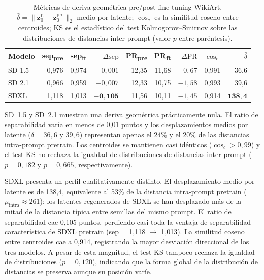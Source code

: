 \documentclass[12pt, a4paper, twoside]{book}
\newcommand{\z}{\mathbf{z}}
\begin{document}
\begin{table}[htb]
\centering
\caption{Métricas de deriva geométrica pre/post fine-tuning WikiArt. $\bar{\delta} = \|\z_0^\text{ft} - \z_0^\text{pre}\|_2$ medio por latente; $\cos_c$ es la similitud coseno entre centroides; KS es el estadístico del test Kolmogorov--Smirnov sobre las distribuciones de distancias inter-prompt (valor $p$ entre paréntesis).}
\label{tab:deriva_geometrica}
\small
\begin{tabular}{lrrrrrrrr}
\toprule
\textbf{Modelo} & \textbf{sep\textsubscript{pre}} & \textbf{sep\textsubscript{ft}} & $\Delta\text{sep}$ & \textbf{PR\textsubscript{pre}} & \textbf{PR\textsubscript{ft}} & $\Delta\text{PR}$ & $\cos_c$ & $\bar{\delta}$ \\
\midrule
SD 1.5 & 0,976 & 0,974 & $-0{,}001$ & 12,35 & 11,68 & $-0{,}67$ & 0,991 & \phantom{0}36,6 \\
SD 2.1 & 0,966 & 0,959 & $-0{,}007$ & 12,33 & 10,75 & $-1{,}58$ & 0,993 & \phantom{0}39,6 \\
SDXL   & 1,118 & 1,013 & $\mathbf{-0{,}105}$ & 11,56 & 10,11 & $-1{,}45$ & 0,914 & $\mathbf{138,4}$ \\
\bottomrule
\end{tabular}
\end{table}

SD~1.5 y SD~2.1 muestran una deriva geométrica prácticamente nula. El ratio de separabilidad varía en menos de 0,01 puntos y los desplazamientos medios por latente ($\bar{\delta} = 36{,}6$ y $39{,}6$) representan apenas el 24\% y el 20\% de las distancias intra-prompt pretrain. Los centroides se mantienen casi idénticos ($\cos_c > 0{,}99$) y el test KS no rechaza la igualdad de distribuciones de distancias inter-prompt ($p = 0{,}182$ y $p = 0{,}665$, respectivamente).

SDXL presenta un perfil cualitativamente distinto. El desplazamiento medio por latente es de 138,4, equivalente al 53\% de la distancia intra-prompt pretrain ($\mu_\text{intra} \approx 261$): los latentes regenerados de SDXL se han desplazado más de la mitad de la distancia típica entre semillas del mismo prompt. El ratio de separabilidad cae 0,105 puntos, perdiendo casi toda la ventaja de separabilidad característica de SDXL pretrain (sep = 1,118 $\to$ 1,013). La similitud coseno entre centroides cae a 0,914, registrando la mayor desviación direccional de los tres modelos. A pesar de esta magnitud, el test KS tampoco rechaza la igualdad de distribuciones ($p = 0{,}120$), indicando que la forma global de la distribución de distancias se preserva aunque su posición varíe.
\end{document}
